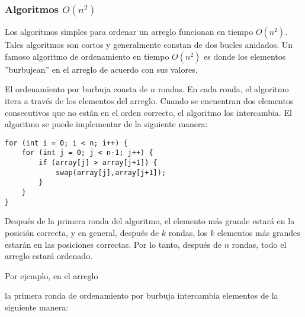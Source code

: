 \subsubsection{Algoritmos $O(n^2)$}


Los algoritmos simples para ordenar un arreglo
funcionan en tiempo $O(n^2)$.
Tales algoritmos son cortos y generalmente
constan de dos bucles anidados.
Un famoso algoritmo de ordenamiento en tiempo $O(n^2)$
es  donde los elementos
''burbujean'' en el arreglo de acuerdo con sus valores.

El ordenamiento por burbuja consta de $n$ rondas.
En cada ronda, el algoritmo itera a través
de los elementos del arreglo.
Cuando se encuentran dos elementos consecutivos
que no están en el orden correcto,
el algoritmo los intercambia.
El algoritmo se puede implementar de la siguiente manera:
\begin{lstlisting}
for (int i = 0; i < n; i++) {
    for (int j = 0; j < n-1; j++) {
        if (array[j] > array[j+1]) {
            swap(array[j],array[j+1]);
        }
    }
}
\end{lstlisting}

Después de la primera ronda del algoritmo,
el elemento más grande estará en la posición correcta,
y en general, después de $k$ rondas, los $k$ elementos más grandes
estarán en las posiciones correctas.
Por lo tanto, después de $n$ rondas, todo el arreglo
estará ordenado.

Por ejemplo, en el arreglo

\begin{center}
\end{center}

\noindent
la primera ronda de ordenamiento por burbuja intercambia elementos
de la siguiente manera:

\begin{center}
\end{center}

